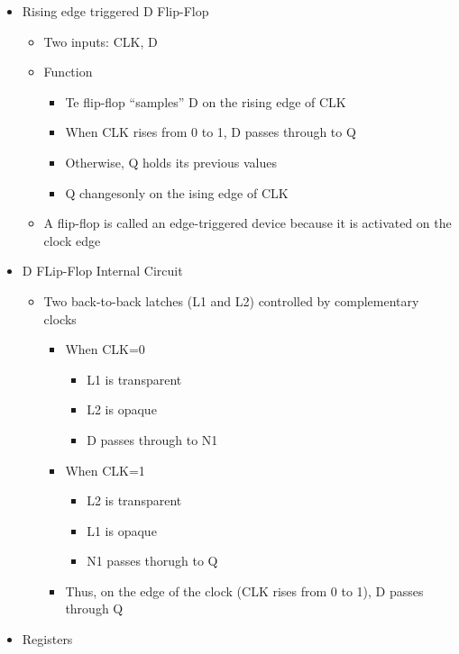 \documentclass[a4paper]{article}
\begin{document}
\begin{itemize}
\begin{itemize}
\begin{itemize}
\begin{center}
						\end{center}
					\end{itemize}
			\end{itemize}
		\item Rising edge triggered D Flip-Flop
			\begin{itemize}
				\item Two inputs: CLK, D
				\item Function
					\begin{itemize}
						\item Te flip-flop ``samples'' D on the rising edge of CLK
						\item When CLK rises from 0 to 1, D passes through to Q
						\item Otherwise, Q holds its previous values
						\item Q changesonly on the ising edge of CLK
					\end{itemize}
				\item A flip-flop is called an edge-triggered device because it is activated on the clock edge
			\end{itemize}
		\item D FLip-Flop Internal Circuit
			\begin{itemize}
				\item Two back-to-back latches (L1 and L2) controlled by complementary clocks
					\begin{itemize}
						\item When CLK=0
							\begin{itemize}
								\item L1 is transparent
								\item L2 is opaque
								\item D passes through to N1
							\end{itemize}
						\item When CLK=1
							\begin{itemize}
								\item L2 is transparent
								\item L1 is opaque
								\item N1 passes thorugh to Q
							\end{itemize}	
						\item Thus, on the edge of the clock (CLK rises from 0 to 1), D passes through Q
					\end{itemize}
			\end{itemize}
		\item Registers
			\begin{itemize}

\end{itemize}
\end{itemize}
\end{document}
